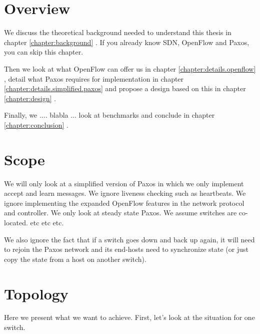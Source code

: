 \section{Overview}

We discuss the theoretical background needed to understand this thesis in
chapter \ref{chapter:background} .  If you already know \acs{SDN},
OpenFlow and Paxos, you can skip this chapter.

Then we look at what OpenFlow can offer us in chapter
\ref{chapter:details.openflow}
, detail what Paxos requires for
implementation in chapter \ref{chapter:details.simplified.paxos} 
 and propose a
design based on this in chapter \ref{chapter:design} .

Finally, we .... blabla ... look at benchmarks and conclude in chapter
\ref{chapter:conclusion} .

\section{Scope}


We will only look at a simplified version of Paxos in which we only
implement accept and learn messages. We ignore liveness checking such as
heartbeats. We ignore implementing the expanded OpenFlow features in the
network protocol and controller. We only look at steady state Paxos.
We assume switches are co-located. etc etc etc.

We also ignore the fact that if a switch goes down and back up again, it
will need to rejoin the Paxos network and its end-hosts need to synchronize
state (or just copy the state from a host on another switch).

\section{Topology}


Here we present what we want to achieve.  First, let's look at the situation
for one switch.


